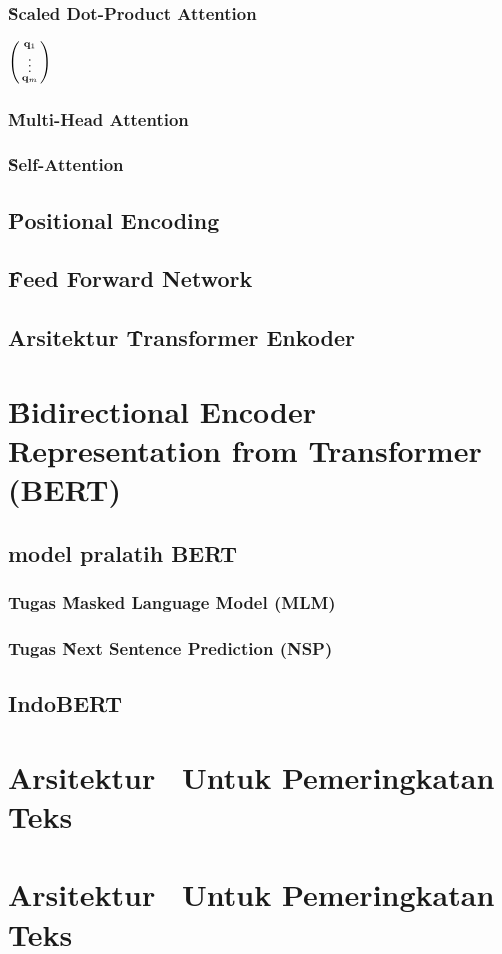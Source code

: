 \subsubsection{\f{Scaled Dot-Product Attention}}

$\begin{psmallmatrix}
	\mathbf{q}_1 \\
	\vdots \\
	\mathbf{q}_m
\end{psmallmatrix}
$

\subsubsection{\f{Multi-Head Attention}}

\subsubsection{\f{Self-Attention}}

\subsection{\f{Positional Encoding}}

\subsection{\f{Feed Forward Network}}


\subsection{Arsitektur \f{Transformer} Enkoder}

\section{\f{Bidirectional Encoder Representation from Transformer (BERT)}}

\subsection{model pralatih BERT}
\subsubsection{Tugas \f{Masked Language Model (MLM)}}

\subsubsection{Tugas \f{Next Sentence Prediction (NSP)}}

\subsection{IndoBERT}
\section{Arsitektur \bertcat~Untuk Pemeringkatan Teks}

\section{Arsitektur \bertdot~Untuk Pemeringkatan Teks}


